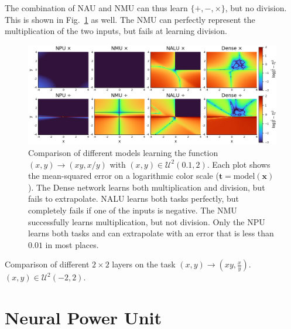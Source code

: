 \documentclass[9pt]{article}
\begin{document}
The combination of NAU and NMU can thus learn $\{+,-,\times\}$, but no division.
This is shown in Fig.~\ref{fig:compare_npu_nmu_nalu_xy_xdivy} as well. The NMU
can perfectly represent the multiplication of the two inputs, but fails at
learning division.


\begin{figure}
  \centering
  \includegraphics[width=0.8\linewidth]{compare-npu-nmu-nalu-xy-xdivy.png}
  \caption{Comparison of different models learning the function
  $(x,y)\rightarrow(xy,x/y)$ with $(x,y)\in\mathcal U^2(0.1,2)$.  Each
  plot shows the mean-squared error on a logarithmic color scale ($\hat{\bm
  t}=\text{model}(\bm x)$).  The Dense network learns both multiplication and
  division, but fails to extrapolate. NALU learns both tasks perfectly, but
  completely fails if one of the inputs is negative.  The NMU successfully
  learns multiplication, but not division. Only the NPU learns both tasks and
  can extrapolate with an error that is less than $0.01$ in most places.}%
  \label{fig:compare_npu_nmu_nalu_xy_xdivy}
\end{figure}
\begin{table}
  \centering
  \caption{Comparison of different $2\times2$ layers on the task
  $(x,y)\rightarrow(xy,\frac{x}{y})$.  $(x,y) \in \mathcal U^2(-2,2)$.}
  \label{tab:compare_npu_npu_nalu}
  
\end{table}

\section{Neural Power Unit}%
\label{sec:neural_power_unit}
\end{document}
